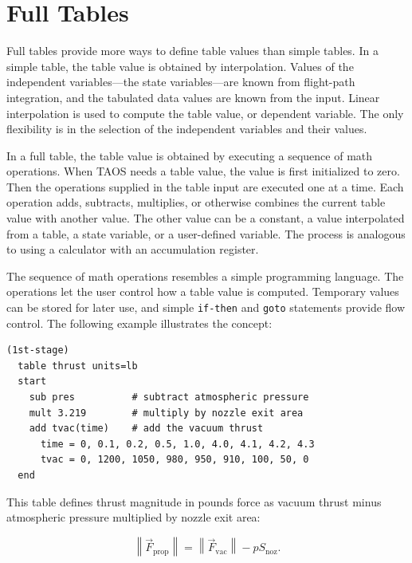 \section{Full Tables}\label{sec:full-tables}

Full tables provide more ways to define table values than simple tables. In a simple
table, the table value is obtained by interpolation. Values of the independent
variables---the state variables---are known from flight-path integration, and the
tabulated data values are known from the input. Linear interpolation is used to
compute the table value, or dependent variable. The only flexibility is in the
selection of the independent variables and their values.

In a full table, the table value is obtained by executing a sequence of math
operations. When TAOS needs a table value, the value is first initialized to zero.
Then the operations supplied in the table input are executed one at a time. Each
operation adds, subtracts, multiplies, or otherwise combines the current table value
with another value. The other value can be a constant, a value interpolated from a
table, a state variable, or a user-defined variable. The process is analogous to using
a calculator with an accumulation register.

The sequence of math operations resembles a simple programming language. The
operations let the user control how a table value is computed. Temporary values can
be stored for later use, and simple \texttt{if-then} and \texttt{goto} statements
provide flow control. The following example illustrates the concept:

\begin{lstlisting}[style=taosmanual]
(1st-stage)
  table thrust units=lb
  start
    sub pres          # subtract atmospheric pressure
    mult 3.219        # multiply by nozzle exit area
    add tvac(time)    # add the vacuum thrust
      time = 0, 0.1, 0.2, 0.5, 1.0, 4.0, 4.1, 4.2, 4.3
      tvac = 0, 1200, 1050, 980, 950, 910, 100, 50, 0
  end
\end{lstlisting}

This table defines thrust magnitude in pounds force as vacuum thrust minus
atmospheric pressure multiplied by nozzle exit area:

\begin{equation}
  \left\lVert\vec{F}_{\mathrm{prop}}\right\rVert
  = \left\lVert\vec{F}_{\mathrm{vac}}\right\rVert - pS_{\mathrm{noz}}.
  \label{eq:full-table-thrust}
\end{equation}

